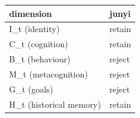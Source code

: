 \begin{tabular}{ll}
\toprule
dimension & junyi \\
\midrule
I\_t (identity) & retain \\
C\_t (cognition) & retain \\
B\_t (behaviour) & reject \\
M\_t (metacognition) & reject \\
G\_t (goals) & reject \\
H\_t (historical memory) & retain \\
\bottomrule
\end{tabular}
